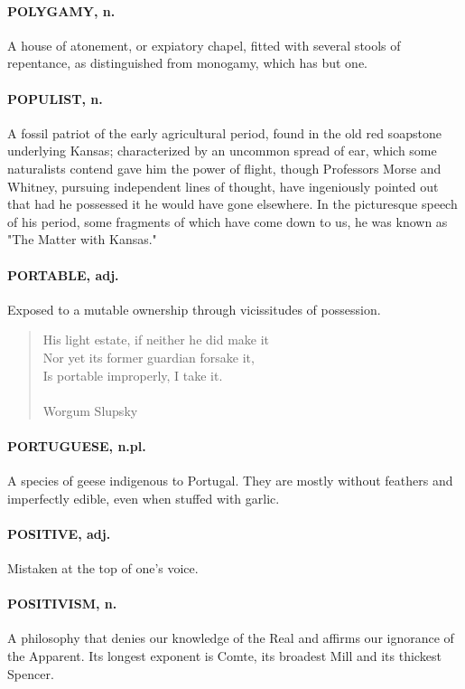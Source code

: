 \documentclass[11pt]{article}
\begin{document}
\paragraph{POLYGAMY, n.}  A house of atonement, or expiatory chapel, fitted with
several stools of repentance, as distinguished from monogamy, which
has but one.

\paragraph{POPULIST, n.}  A fossil patriot of the early agricultural period, found
in the old red soapstone underlying Kansas; characterized by an
uncommon spread of ear, which some naturalists contend gave him the
power of flight, though Professors Morse and Whitney, pursuing
independent lines of thought, have ingeniously pointed out that had he
possessed it he would have gone elsewhere.  In the picturesque speech
of his period, some fragments of which have come down to us, he was
known as "The Matter with Kansas."

\paragraph{PORTABLE, adj.}  Exposed to a mutable ownership through vicissitudes of
possession.

\begin{quote}   His light estate, if neither he did make it \\
  Nor yet its former guardian forsake it, \\
  Is portable improperly, I take it. \\
 \\
Worgum Slupsky \end{quote}


\paragraph{PORTUGUESE, n.pl.}  A species of geese indigenous to Portugal.  They
are mostly without feathers and imperfectly edible, even when stuffed
with garlic.

\paragraph{POSITIVE, adj.}  Mistaken at the top of one's voice.

\paragraph{POSITIVISM, n.}  A philosophy that denies our knowledge of the Real and
affirms our ignorance of the Apparent.  Its longest exponent is Comte,
its broadest Mill and its thickest Spencer.
\end{document}
